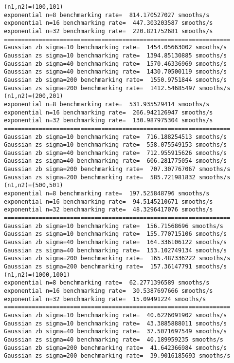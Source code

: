 \documentclass[10pt]{article}
\begin{document}
\begin{verbatim}
(n1,n2)=(100,101)
exponential n=8 benchmarking rate=  814.170527027 smooths/s
exponential n=16 benchmarking rate=  447.303203587 smooths/s
exponential n=32 benchmarking rate=  220.821752681 smooths/s
=================================================================
Gaussian zb sigma=10 benchmarking rate=  1454.05663002 smooths/s
Gaussian zs sigma=10 benchmarking rate=  1394.85130885 smooths/s
Gaussian zb sigma=40 benchmarking rate=  1570.46336969 smooths/s
Gaussian zs sigma=40 benchmarking rate=  1430.70500119 smooths/s
Gaussian zb sigma=200 benchmarking rate=  1550.9751844 smooths/s
Gaussian zs sigma=200 benchmarking rate=  1412.54685497 smooths/s
(n1,n2)=(200,201)
exponential n=8 benchmarking rate=  531.935529414 smooths/s
exponential n=16 benchmarking rate=  266.942126947 smooths/s
exponential n=32 benchmarking rate=  130.987975304 smooths/s
=================================================================
Gaussian zb sigma=10 benchmarking rate=  716.188254513 smooths/s
Gaussian zs sigma=10 benchmarking rate=  558.075549153 smooths/s
Gaussian zb sigma=40 benchmarking rate=  712.955915626 smooths/s
Gaussian zs sigma=40 benchmarking rate=  606.281775054 smooths/s
Gaussian zb sigma=200 benchmarking rate=  707.307767067 smooths/s
Gaussian zs sigma=200 benchmarking rate=  585.721981832 smooths/s
(n1,n2)=(500,501)
exponential n=8 benchmarking rate=  197.525848796 smooths/s
exponential n=16 benchmarking rate=  94.5145210671 smooths/s
exponential n=32 benchmarking rate=  48.3296417076 smooths/s
=================================================================
Gaussian zb sigma=10 benchmarking rate=  156.71568696 smooths/s
Gaussian zs sigma=10 benchmarking rate=  155.770715106 smooths/s
Gaussian zb sigma=40 benchmarking rate=  164.336106122 smooths/s
Gaussian zs sigma=40 benchmarking rate=  153.102749134 smooths/s
Gaussian zb sigma=200 benchmarking rate=  165.487336222 smooths/s
Gaussian zs sigma=200 benchmarking rate=  157.36147791 smooths/s
(n1,n2)=(1000,1001)
exponential n=8 benchmarking rate=  62.2771396589 smooths/s
exponential n=16 benchmarking rate=  30.5387697666 smooths/s
exponential n=32 benchmarking rate=  15.09491224 smooths/s
=================================================================
Gaussian zb sigma=10 benchmarking rate=  40.6226091902 smooths/s
Gaussian zs sigma=10 benchmarking rate=  43.3885888011 smooths/s
Gaussian zb sigma=40 benchmarking rate=  37.5071697549 smooths/s
Gaussian zs sigma=40 benchmarking rate=  40.189959235 smooths/s
Gaussian zb sigma=200 benchmarking rate=  41.642366984 smooths/s
Gaussian zs sigma=200 benchmarking rate=  39.9016185693 smooths/s
\end{verbatim}
\end{document}
